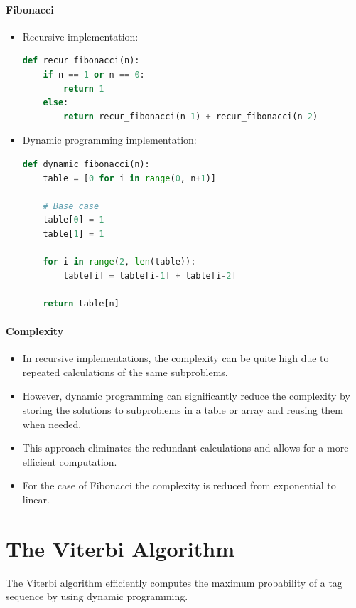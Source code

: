 \paragraph{Fibonacci}
    \begin{itemize}
    \item Recursive implementation:

    \begin{lstlisting}[language=Python]
def recur_fibonacci(n):
    if n == 1 or n == 0:
        return 1
    else:
        return recur_fibonacci(n-1) + recur_fibonacci(n-2)
    \end{lstlisting}

    \item Dynamic programming implementation:

    \begin{lstlisting}[language=Python]
def dynamic_fibonacci(n):
    table = [0 for i in range(0, n+1)]

    # Base case
    table[0] = 1
    table[1] = 1

    for i in range(2, len(table)):
        table[i] = table[i-1] + table[i-2]

    return table[n]
    \end{lstlisting}

  \end{itemize}


\paragraph{Complexity}

  \begin{itemize}
  
  \item In recursive implementations, the complexity can be quite high due to repeated calculations of the same subproblems. 
  \item However, dynamic programming can significantly reduce the complexity by storing the solutions to subproblems in a table or array and reusing them when needed. 
  \item This approach eliminates the redundant calculations and allows for a more efficient computation.
  \item For the case of Fibonacci the complexity is reduced from exponential to linear. 
  \end{itemize}



\section{The Viterbi Algorithm}
  The Viterbi algorithm efficiently computes the maximum probability of a tag sequence by using dynamic programming.

